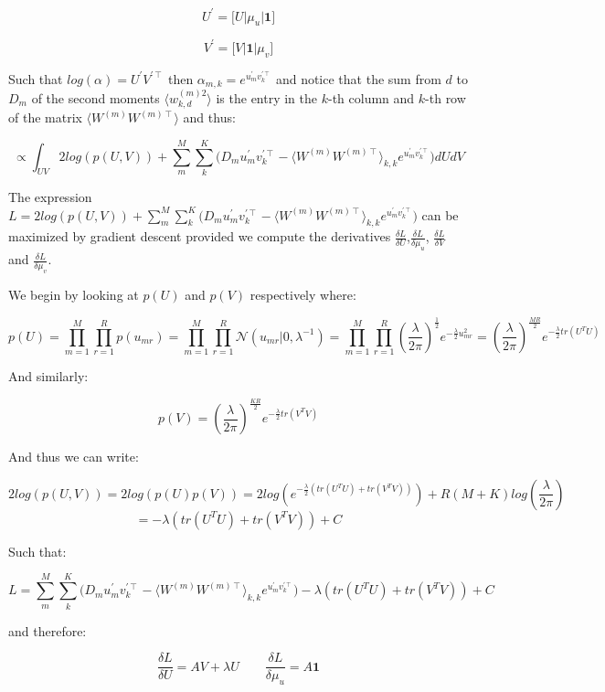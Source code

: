 \documentclass{article}
\begin{document}
$$U^\prime = \bigg[U\bigg|\mu_u\bigg|\textbf{1}\bigg]$$

$$V^\prime = \bigg[V\bigg|\textbf{1}\bigg|\mu_v\bigg]$$

Such that $log(\alpha) = U^\prime V^{\prime \intercal}$ then $\alpha_{m,k} = e^{u^\prime_m v_k^{\prime \intercal}}$ and notice that the sum from $d$ to $D_m$ of the second moments $\langle w_{k,d}^{(m)2}\rangle$ is the entry in the $k$-th column and $k$-th row of the matrix $\langle W^{(m)}W^{(m)\intercal}\rangle$ and thus:

$$\propto \int_{UV}{2log(p(U,V)) + \sum_m^M{\sum_k^K{\Big(D_m u^\prime_m v_k^{\prime \intercal} - \langle W^{(m)}W^{(m)\intercal}\rangle_{k,k}e^{u^\prime_m v_k^{\prime \intercal}}  \Big) }}dUdV}$$

The expression $L = 2log(p(U,V)) + \sum_m^M{\sum_k^K{\Big(D_m u^\prime_m v_k^{\prime \intercal} - \langle W^{(m)}W^{(m)\intercal}\rangle_{k,k}e^{u^\prime_m v_k^{\prime \intercal}}  \Big) }}$ can be maximized by gradient descent provided we compute the derivatives $\frac{\delta L}{\delta U}$,$\frac{\delta L}{\delta \mu_u}$, $\frac{\delta L}{\delta V}$ and $\frac{\delta L}{\delta \mu_v}$.

\bigskip

We begin by looking at $p(U)$ and $p(V)$ respectively where:

$$p(U) = \prod_{m=1}^M \prod_{r=1}^R p(u_{mr}) = \prod_{m=1}^M \prod_{r=1}^R \mathcal{N}(u_{mr}|0,\lambda^{-1}) = \prod_{m=1}^M \prod_{r=1}^R (\frac{\lambda}{2\pi})^{\frac{1}{2}}e^{-\frac{\lambda}{2}u_{mr}^2} = (\frac{\lambda}{2\pi})^{\frac{MR}{2}}e^{-\frac{\lambda}{2}tr(U^TU)}$$

And similarly:

$$p(V) = (\frac{\lambda}{2\pi})^{\frac{KR}{2}}e^{-\frac{\lambda}{2}tr(V^TV)}$$

And thus we can write:

$$2log(p(U,V)) = 2log(p(U) p(V)) = 2log(e^{-\frac{\lambda}{2}(tr(U^TU)+tr(V^TV))}) + R(M+K) log(\frac{\lambda}{2\pi})$$
$$ =  -\lambda (tr(U^TU)+tr(V^TV)) + C$$

Such that:

$$L = \sum_m^M{\sum_k^K{\Big(D_m u^\prime_m v_k^{\prime \intercal} - \langle W^{(m)}W^{(m)\intercal}\rangle_{k,k}e^{u^\prime_m v_k^{\prime \intercal}}  \Big) }}-\lambda (tr(U^TU)+tr(V^TV)) + C$$

and therefore:

$$\frac{\delta L}{\delta U} = AV + \lambda U \qquad \frac{\delta L}{\delta \mu_u} = A\textbf{1}$$
\end{document}

